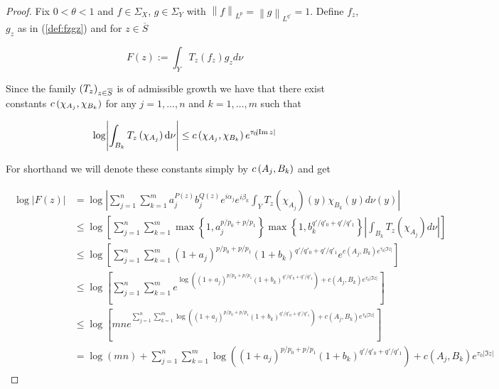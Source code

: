 \begin{proof}
	Fix $0 < \theta < 1$ and $f \in \Sigma_X$, $g \in \Sigma_Y$ with $\left\|f\right\|_{L^p} = \left\|g\right\|_{L^{q'}} = 1$. Define $f_z$, $g_z$ as in (\ref{def:fzgz}) and for $z \in \overline{S}$

	\begin{equation}
		F(z) := \int_Y T_z(f_z)g_z d\nu	
	\end{equation}

	Since the family $\del{T_z}_{z \in \overline{S}}$ is of admissible growth we have that there exist constants $c\del[0]{\chi_{A_j},\chi_{B_k}}$ for any $j = 1,\dots,n$ and $k = 1,\dots,m$ such that 

	\begin{equation*}
		\log\abs{\int_{B_k}T_z\del[0]{\chi_{A_j}}\d \nu} \leq c\del[0]{\chi_{A_j},\chi_{B_k}}e^{\tau_0\abs{\Im z}}
	\end{equation*}

	For shorthand we will denote these constants simply by $c\del[0]{A_j,B_k}$ and get

	\begin{gather*}
		\begin{aligned}
			\log \left| F(z) \right| &= \log \left| \sum_{j = 1}^n\sum_{k = 1}^m a^{P(z)}_j b_j^{Q(z)} e^{i\alpha_j} e^{i\beta_k} \int_YT_z(\chi_{A_j})(y)\chi_{B_k}(y)d\nu(y)\right|\\
			&\leq  \log \left[ \sum_{j = 1}^n\sum_{k = 1}^m \max\left\{1,a_j^{p/p_0 + p/p_1}\right\} \max\left\{1,b_k^{q'/q'_0 + q'/q'_1}\right\} \left|\int_{B_k} T_z(\chi_{A_j}) d\nu\right|\right]\\
		&\leq \log\left[ \sum_{j = 1}^n\sum_{k = 1}^m \left( 1 + a_j\right)^{p/p_0 + p/p_1} \left(1 + b_k\right)^{q'/q'_0 + q'/q'_1} e^{c(A_j,B_k)e^{\tau_0 \left| \Im z\right|}} \right]\\
	&\leq  \log\left[ \sum_{j = 1}^n\sum_{k = 1}^m e^{\log\left(\left( 1 + a_j\right)^{p/p_0 + p/p_1}\left( 1 + b_k\right)^{q'/q'_0 + q'/q'_1}\right) + c(A_j,B_k)e^{\tau_0 \left| \Im z\right|}} \right]\\
	&\leq \log\left[ mn e^{\sum_{j = 1}^n\sum_{k = 1}^m\log\left(\left( 1 + a_j\right)^{p/p_0 + p/p_1} \left(1 + b_k\right)^{q'/q'_0 + q'/q'_1}\right) + c(A_j,B_k)e^{\tau_0 \left| \Im z\right|}} \right]\\
			&= \log\left( mn \right) + \sum_{j = 1}^n\sum_{k = 1}^m\log\left(\left(1 + a_j\right)^{p/p_0 + p/p_1}\left(1 +  b_k\right)^{q'/q'_0 + q'/q'_1}\right) + c(A_j,B_k)e^{\tau_0 \left| \Im z\right|}
		\end{aligned}
	\end{gather*}


\end{proof}

